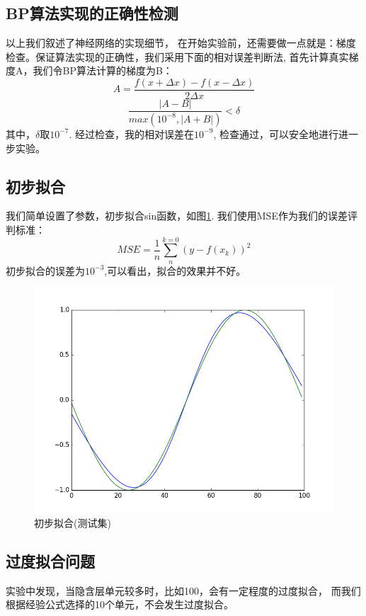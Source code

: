 \documentclass{article}
\begin{document}
\begin{CJK}{UTF8}{gkai}
\subsection{BP算法实现的正确性检测}
以上我们叙述了神经网络的实现细节， 在开始实验前，还需要做一点就是：梯度检查。保证算法实现的正确性，我们采用下面的相对误差判断法, 首先计算真实梯度A，我们令BP算法计算的梯度为B：
\begin{equation}
	A = \frac{f(x+\Delta x)-f(x-\Delta x)}{2\Delta x}
\end{equation}
\begin{equation}
\frac{|A-B|}{max(10^{-8}, |A+B|)} < \delta
\end{equation}
其中，$\delta$取$10^{-7}$. 经过检查，我的相对误差在$10^{-9}$, 检查通过，可以安全地进行进一步实验。

\subsection{初步拟合}
我们简单设置了参数，初步拟合sin函数，如图\ref{fig:fig1}.
我们使用MSE作为我们的误差评判标准：
\begin{equation}
	MSE = \frac{1}{n}\sum_{n}^{k=0}(y-f(x_k))^2
\end{equation}
初步拟合的误差为$10^{-3}$,可以看出，拟合的效果并不好。

\begin{figure}
\centering
\includegraphics[width=.8\linewidth]{../fig1}
\caption{初步拟合(测试集)}
\label{fig:fig1}
\end{figure}

\subsection{过度拟合问题}
实验中发现，当隐含层单元较多时，比如100，会有一定程度的过度拟合，
而我们根据经验公式选择的10个单元，不会发生过度拟合。


\end{CJK}
\end{document}
